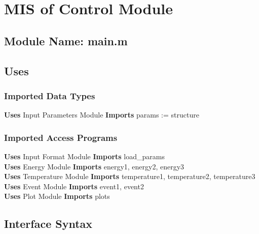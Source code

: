 \documentclass[12pt]{article}
\begin{document}
\section{MIS of Control Module}

\subsection{Module Name: main.m}

\subsection{Uses}



\subsubsection{Imported Data Types}
\textbf{Uses} Input Parameters Module \textbf{Imports} params := structure 

\subsubsection{Imported Access Programs}
\textbf{Uses} Input Format Module \textbf{Imports} load\_{params} \\
\textbf{Uses} Energy Module \textbf{Imports} energy1, energy2, energy3 \\
\textbf{Uses} Temperature Module \textbf{Imports} 
temperature1, temperature2, temperature3 \\
\textbf{Uses} Event Module \textbf{Imports} event1, event2 \\
\textbf{Uses} Plot Module \textbf{Imports} plots \\


\subsection{Interface Syntax}


\end{document}
